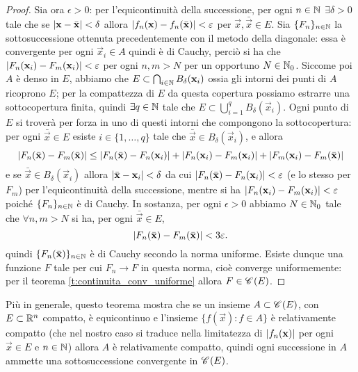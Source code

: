 \begin{proof}
    Sia ora $\epsilon>0$: per l'equicontinuità della successione, per ogni $n\in\mathbb{N}$ $\exists\delta>0$ tale che se $\lvert\mathbf{x}-\bar{\mathbf{x}}\rvert<\delta$ allora $\lvert f_n(\mathbf{x})-f_n(\bar{\mathbf{x}})\rvert<\varepsilon$ per $\vec x,\bar{\vec x}\in E$.
    Sia $\{F_n\}_{n\in\mathbb{N}}$ la sottosuccessione ottenuta precedentemente con il metodo della diagonale: essa è convergente per ogni $\vec x_i\in A$ quindi è di Cauchy, perciò si ha che $\lvert F_n(\mathbf{x}_i)-F_m(\mathbf{x}_i)\rvert<\varepsilon$ per ogni $n,m>N$ per un opportuno $N\in\mathbb{N}_0$.
    Siccome poi $A$ è denso in $E$, abbiamo che $E\subset\bigcap_{i\in\mathbb{N}} B_{\delta}(\mathbf{x}_i)$ ossia gli intorni dei punti di $A$ ricoprono $E$; per la compattezza di $E$ da questa copertura possiamo estrarre una sottocopertura finita, quindi $\exists q\in\mathbb{N}$ tale che $E\subset\bigcup_{i=1}^q B_\delta(\vec x_i)$.
    Ogni punto di $E$ si troverà per forza in uno di questi intorni che compongono la sottocopertura: per ogni $\bar{\vec x}\in E$ esiste $i\in\{1,\dotsc,q\}$ tale che $\bar{\vec x}\in B_\delta(\vec x_i)$, e allora
    \begin{equation}
        \lvert F_n(\bar{\mathbf{x}})-F_m(\bar{\mathbf{x}})\rvert\le
        \lvert F_n(\bar{\mathbf{x}})-F_n(\mathbf{x}_i)\rvert+\lvert F_n(\mathbf{x}_i)-F_m(\mathbf{x}_i)\rvert+\lvert F_m(\mathbf{x}_i)-F_m(\bar{\mathbf{x}})\rvert
    \end{equation}
    e se $\bar{\vec x}\in B_\delta(\vec x_i)$ allora $\lvert\bar{\mathbf{x}}-\mathbf{x}_i\rvert<\delta$ da cui $\lvert F_n(\bar{\mathbf{x}})-F_n(\mathbf{x}_i)\rvert<\varepsilon$ (e lo stesso per $F_m$) per l'equicontinuità della successione, mentre si ha $\lvert F_n(\mathbf{x}_i)-F_m(\mathbf{x}_i)\rvert<\varepsilon$ poich\'e $\{F_n\}_{n\in\mathbb{N}}$ è di Cauchy.
    In sostanza, per ogni $\epsilon>0$ abbiamo $N\in\mathbb{N}_0$ tale che $\forall n,m>N$ si ha, per ogni $\bar{\vec x}\in E$,
    \begin{equation}
        \lvert F_n(\bar{\mathbf{x}})-F_m(\bar{\mathbf{x}})\rvert<3\varepsilon.
    \end{equation}
    quindi $\{F_n(\bar{\mathbf{x}})\}_{n\in\mathbb{N}}$ è di Cauchy secondo la norma uniforme.
    Esiste dunque una funzione $F$ tale per cui $F_n\to F$ in questa norma, cioè converge uniformemente: per il teorema \ref{t:continuita_conv_uniforme} allora $F\in\mathscr C^{}(E)$.
\end{proof}
Più in generale, questo teorema mostra che se un insieme $A\subset\mathscr C^{}(E)$, con $E\subset\mathbb{R}^n$ compatto, è equicontinuo e l'insieme $\{f(\vec x)\colon f\in A\}$ è relativamente compatto (che nel nostro caso si traduce nella limitatezza di $\lvert f_n(\mathbf{x})\rvert$ per ogni $\vec x\in E$ e $n\in\mathbb{N}$) allora $A$ è relativamente compatto, quindi ogni successione in $A$ ammette una sottosuccessione convergente in $\mathscr C^{}(E)$.

